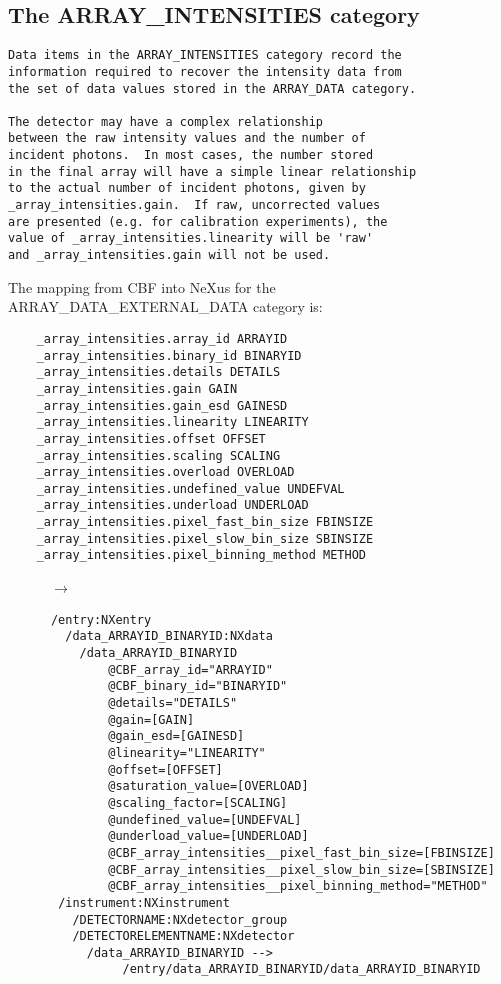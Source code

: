 \documentclass[11pt]{article}
\begin{document}
\subsection{The ARRAY\_INTENSITIES category}

{\footnotesize\begin{verbatim}
Data items in the ARRAY_INTENSITIES category record the
information required to recover the intensity data from
the set of data values stored in the ARRAY_DATA category.

The detector may have a complex relationship
between the raw intensity values and the number of
incident photons.  In most cases, the number stored
in the final array will have a simple linear relationship
to the actual number of incident photons, given by
_array_intensities.gain.  If raw, uncorrected values
are presented (e.g. for calibration experiments), the
value of _array_intensities.linearity will be 'raw'
and _array_intensities.gain will not be used.
\end{verbatim}

The mapping from CBF into NeXus for the ARRAY\_DATA\_EXTERNAL\_DATA category is:

\begin{verbatim}     
    _array_intensities.array_id ARRAYID
    _array_intensities.binary_id BINARYID
    _array_intensities.details DETAILS
    _array_intensities.gain GAIN
    _array_intensities.gain_esd GAINESD
    _array_intensities.linearity LINEARITY
    _array_intensities.offset OFFSET
    _array_intensities.scaling SCALING
    _array_intensities.overload OVERLOAD
    _array_intensities.undefined_value UNDEFVAL
    _array_intensities.underload UNDERLOAD
    _array_intensities.pixel_fast_bin_size FBINSIZE
    _array_intensities.pixel_slow_bin_size SBINSIZE
    _array_intensities.pixel_binning_method METHOD
\end{verbatim}
~~~~~~$\rightarrow$\\
\begin{verbatim}
      /entry:NXentry
        /data_ARRAYID_BINARYID:NXdata
          /data_ARRAYID_BINARYID
              @CBF_array_id="ARRAYID"
              @CBF_binary_id="BINARYID"
              @details="DETAILS"
              @gain=[GAIN]     
              @gain_esd=[GAINESD]
              @linearity="LINEARITY"
              @offset=[OFFSET]
              @saturation_value=[OVERLOAD]
              @scaling_factor=[SCALING]
              @undefined_value=[UNDEFVAL]
              @underload_value=[UNDERLOAD]
              @CBF_array_intensities__pixel_fast_bin_size=[FBINSIZE]
              @CBF_array_intensities__pixel_slow_bin_size=[SBINSIZE]
              @CBF_array_intensities__pixel_binning_method="METHOD"
       /instrument:NXinstrument
         /DETECTORNAME:NXdetector_group
         /DETECTORELEMENTNAME:NXdetector
           /data_ARRAYID_BINARYID -->
                /entry/data_ARRAYID_BINARYID/data_ARRAYID_BINARYID


\end{verbatim}}
\end{document}

